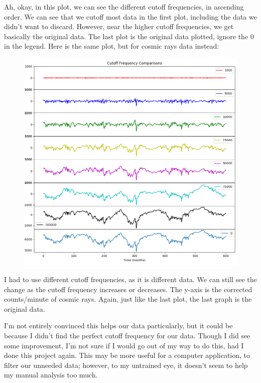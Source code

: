 \documentclass[12pt]{article}
\begin{document}
Ah, okay, in this plot, we can see the different cutoff frequencies, in ascending order. We can see that we cutoff most data in the first plot, including the data we didn't want to discard. However, near the higher cutoff frequencies, we get basically the original data. The last plot is the original data plotted, ignore the $0$ in the legend. Here is the same plot, but for cosmic rays data instead:

\begin{figure}[H]
\begin{center}
\includegraphics[scale=0.7]{rays_freqs.png}
\end{center}
\end{figure}

I had to use different cutoff frequencies, as it is different data. We can still see the change as the cutoff frequency increases or decreases. The y-axis is the corrected counts/minute of cosmic rays. Again, just like the last plot, the last graph is the original data.

I'm not entirely convinced this helps our data particularly, but it could be because I didn't find the perfect cutoff frequency for our data. Though I did see some improvement, I'm not sure if I would go out of my way to do this, had I done this project again. This may be more useful for a computer application, to filter our unneeded data; however, to my untrained eye, it doesn't seem to help my manual analysis too much.
\end{document}
